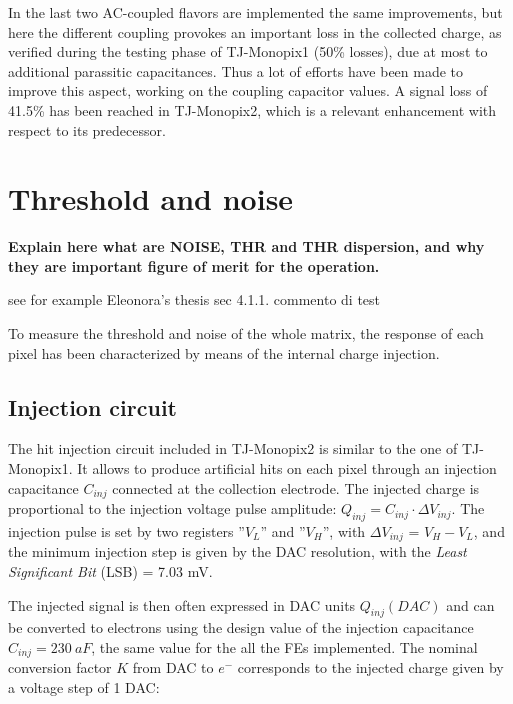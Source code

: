 In the last two AC-coupled flavors are implemented the same improvements, but here the different coupling provokes an important loss in the collected charge, as verified during the testing phase of TJ-Monopix1 (50\% losses), due at most to additional parassitic capacitances. Thus a lot of efforts have been made to improve this aspect, working on the coupling capacitor values. A signal loss of 41.5\% has been reached in TJ-Monopix2, which is a relevant enhancement with respect to its predecessor.





\section{Threshold and noise} \label{thresh_noise}


\textbf{Explain here what are NOISE, THR and THR dispersion, and why they are important figure of merit for the operation.} 

see for example Eleonora's thesis sec 4.1.1. 
commento di test




To measure the threshold and noise of the whole matrix, the response of each pixel has been characterized by means of the internal charge injection. \\

\subsection{Injection circuit} 
\label{inj_circuit_subsection}

The hit injection circuit included in TJ-Monopix2 is similar to the one of TJ-Monopix1. 
It allows to produce artificial hits on each pixel through an injection capacitance \textbf{$C_{inj}$} connected at the collection electrode. The injected charge is proportional to the injection voltage pulse amplitude: $Q_{inj} = C_{inj} \cdot \Delta V_{inj}$. The injection pulse is set by two registers ''\textbf{$V_{L}$}'' and ''\textbf{$V_{H}$}'', with $\Delta V_{inj}$ = \textbf{$V_{H}-V_{L}$}, and the minimum injection step is given by the DAC resolution, with the \textit{Least Significant Bit} (LSB) = 7.03 mV. 

The injected signal is then often expressed in DAC units $Q_{inj}(DAC)$ and can be converted to electrons using the design value of the injection capacitance \textbf{$C_{inj}= 230\ aF$}, the same value for the all the FEs implemented.  
The nominal conversion factor $K$ from DAC to $e^{-}$ corresponds to the injected charge given by a voltage step of 1 DAC: 

